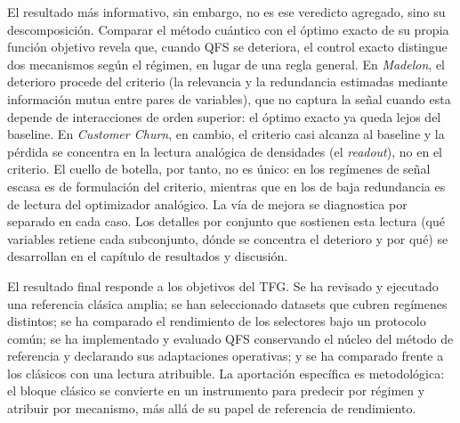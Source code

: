 El resultado más informativo, sin embargo, no es ese veredicto agregado,
sino su descomposición. Comparar el método cuántico con el óptimo exacto
de su propia función objetivo revela que, cuando QFS se deteriora, el control exacto distingue dos
mecanismos según el régimen, en lugar de una regla general. En
\textit{Madelon}, el deterioro procede del criterio (la relevancia y la
redundancia estimadas mediante información mutua entre pares de variables),
que no captura la señal cuando esta depende de interacciones de orden
superior: el óptimo exacto ya queda lejos del baseline. En \textit{Customer
Churn}, en cambio, el criterio casi alcanza al baseline y la pérdida se
concentra en la lectura analógica de densidades (el \textit{readout}), no
en el criterio. El cuello de botella, por tanto, no es único: en los
regímenes de señal escasa es de formulación del criterio, mientras que en
los de baja redundancia es de lectura del optimizador analógico. La vía de
mejora se diagnostica por separado en cada caso. Los detalles por conjunto
que sostienen esta lectura (qué variables retiene cada subconjunto, dónde se
concentra el deterioro y por qué) se desarrollan en el capítulo de
resultados y discusión.

El resultado final responde a los objetivos del TFG\@. Se ha revisado y
ejecutado una referencia clásica amplia; se han seleccionado datasets
que cubren regímenes distintos; se ha comparado el rendimiento de los
selectores bajo un protocolo común; se ha implementado y evaluado QFS
conservando el núcleo del método de referencia y declarando sus
adaptaciones operativas; y se ha comparado frente a los clásicos con
una lectura atribuible. La aportación específica es metodológica: el
bloque clásico se convierte en un instrumento para predecir por régimen y
atribuir por mecanismo, más allá de su papel de referencia de
rendimiento.


